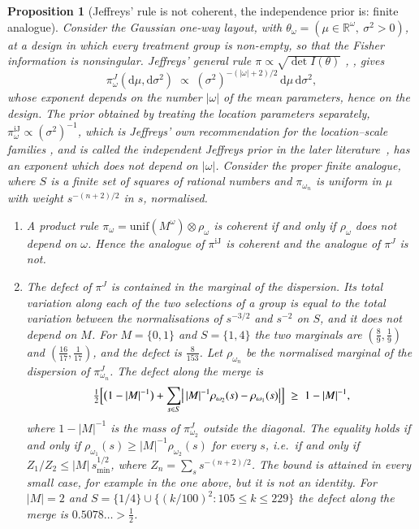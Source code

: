 \documentclass[11pt,a4paper]{article}
\theoremstyle{plain}
\newtheorem{proposition}[theorem]{Proposition}
\theoremstyle{definition}
\theoremstyle{remark}
\newcommand{\R}{\mathbb{R}}
\begin{document}
\begin{proposition}[Jeffreys' rule is not coherent, the independence prior
is: finite analogue]\label{wprop:jeffreys}
Consider the Gaussian one-way layout, with
$\theta_{\omega} = (\mu\in\R^{\omega},\ \sigma^{2}>0)$, at a design in which
every treatment group is non-empty, so that the Fisher information is
nonsingular. Jeffreys' general rule $\pi \propto \sqrt{\det I(\theta)}$
\cite{jeffreys_invariant_1946}, \cite[p.~1345, eq.~(1)]{kass_selection_1996},
gives
\[
\pi^{J}_{\omega}(\mathrm{d}\mu, \mathrm{d}\sigma^{2}) \;\propto\;
(\sigma^{2})^{-(|\omega|+2)/2}\,\mathrm{d}\mu\,\mathrm{d}\sigma^{2},
\]
whose exponent depends on the number $|\omega|$ of the mean parameters, hence
on the design. The prior obtained by treating the location parameters
separately, $\pi^{\mathrm{iJ}}_{\omega} \propto (\sigma^{2})^{-1}$, which is
Jeffreys' own recommendation for the location--scale families
\cite[pp.~182--183]{jeffreys_theory_1961},
\cite[p.~1345, eq.~(2)]{kass_selection_1996} and is called the independent
Jeffreys prior in the later
literature~\cite[pp.~631--632]{consonni_prior_2018}, has an exponent which does
not depend on $|\omega|$. Consider the proper finite analogue, where $S$ is a
finite set of squares of rational numbers and $\pi_{\omega_n}$ is uniform in
$\mu$ with weight $s^{-(n+2)/2}$ in $s$, normalised.
\begin{enumerate}
\item A product rule
$\pi_{\omega} = \mathrm{unif}(M^{\omega}) \otimes \rho_{\omega}$ is coherent if
and only if $\rho_{\omega}$ does not depend on $\omega$. Hence the analogue of
$\pi^{\mathrm{iJ}}$ is coherent and the analogue of $\pi^{J}$ is not.
\item The defect of $\pi^{J}$ is contained in the marginal of the dispersion.
Its total variation along each of the two selections of a group is equal to
the total variation between the normalisations of $s^{-3/2}$ and $s^{-2}$ on
$S$, and it does not depend on $M$. For $M=\{0,1\}$ and $S=\{1,4\}$ the two
marginals are $(\tfrac{8}{9},\tfrac{1}{9})$ and
$(\tfrac{16}{17},\tfrac{1}{17})$, and the defect is $\tfrac{8}{153}$. Let
$\rho_{\omega_n}$ be the normalised marginal of the dispersion of
$\pi^{J}_{\omega_n}$. The defect along the merge is
\[
\tfrac12\Bigl[\bigl(1-|M|^{-1}\bigr)
 + \sum_{s\in S}\bigl|\,|M|^{-1}\rho_{\omega_2}(s)-\rho_{\omega_1}(s)\bigr|\Bigr]
\;\ge\; 1-|M|^{-1},
\]
where $1-|M|^{-1}$ is the mass of $\pi^{J}_{\omega_2}$ outside the diagonal.
The equality holds if and only if
$\rho_{\omega_1}(s) \ge |M|^{-1}\rho_{\omega_2}(s)$ for every $s$, i.e.\ if and
only if $Z_{1}/Z_{2} \le |M|\,s_{\min}^{1/2}$, where
$Z_{n} = \sum_{s} s^{-(n+2)/2}$. The bound is attained in every small case, for
example in the one above, but it is not an identity. For $|M| = 2$ and
$S = \{1/4\} \cup \{(k/100)^{2} : 105 \le k \le 229\}$ the defect along the
merge is $0.5078\ldots > \tfrac12$.
\end{enumerate}
\end{proposition}
\end{document}
